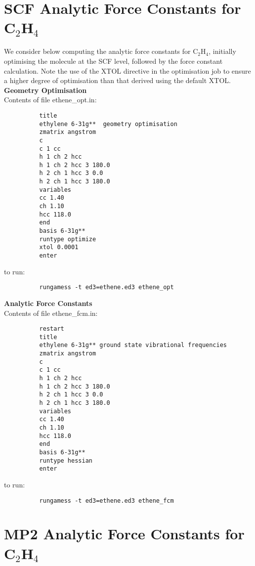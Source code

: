 \documentclass[11pt,fleqn]{article}
\newcommand{\ethene}{\mbox{C$_{2}$H$_{4}$}}
\begin{document}
\section[SCF Analytic Force Constants for \ethene]{SCF Analytic Force Constants for \ethene}

We consider below computing the analytic force constants for
\ethene, initially optimising the molecule at the SCF level, followed
by the force constant calculation. Note the use of the XTOL
directive in the optimisation job to ensure a higher degree
of optimisation than that derived using the default XTOL.\\

{\bf Geometry Optimisation}\\

Contents of file ethene\_opt.in:
{
\footnotesize
\begin{verbatim}
          title 
          ethylene 6-31g**  geometry optimisation
          zmatrix angstrom
          c
          c 1 cc
          h 1 ch 2 hcc
          h 1 ch 2 hcc 3 180.0
          h 2 ch 1 hcc 3 0.0
          h 2 ch 1 hcc 3 180.0
          variables
          cc 1.40
          ch 1.10
          hcc 118.0
          end
          basis 6-31g**
          runtype optimize
          xtol 0.0001
          enter
\end{verbatim}
}
to run:
{
\footnotesize
\begin{verbatim}
          rungamess -t ed3=ethene.ed3 ethene_opt
\end{verbatim}
}
{\bf Analytic Force Constants}\\

Contents of file ethene\_fcm.in:
{
\footnotesize
\begin{verbatim}
          restart
          title 
          ethylene 6-31g** ground state vibrational frequencies
          zmatrix angstrom
          c
          c 1 cc
          h 1 ch 2 hcc
          h 1 ch 2 hcc 3 180.0
          h 2 ch 1 hcc 3 0.0
          h 2 ch 1 hcc 3 180.0
          variables
          cc 1.40
          ch 1.10
          hcc 118.0
          end
          basis 6-31g**
          runtype hessian
          enter
\end{verbatim}
}
to run:
{
\footnotesize
\begin{verbatim}
          rungamess -t ed3=ethene.ed3 ethene_fcm
\end{verbatim}
}
\section[MP2 Analytic Force Constants for \ethene]{MP2 Analytic Force Constants for \ethene}
\end{document}
